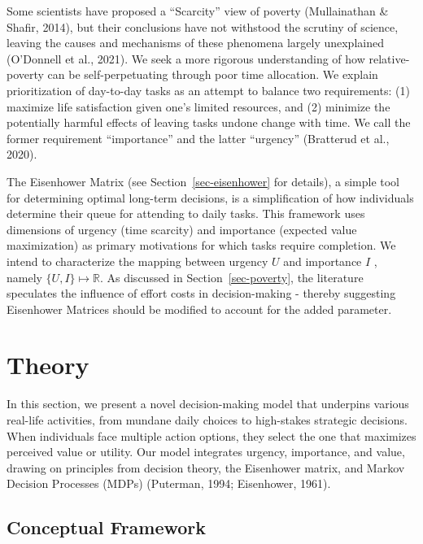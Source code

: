 \documentclass[
]{article}
\begin{document}
Some scientists have proposed a ``Scarcity'' view of poverty
(Mullainathan \& Shafir, 2014), but their conclusions have not withstood
the scrutiny of science, leaving the causes and mechanisms of these
phenomena largely unexplained (O'Donnell et al., 2021). We seek a more
rigorous understanding of how relative-poverty can be self-perpetuating
through poor time allocation. We explain prioritization of day-to-day
tasks as an attempt to balance two requirements: (1) maximize life
satisfaction given one's limited resources, and (2) minimize the
potentially harmful effects of leaving tasks undone change with time. We
call the former requirement ``importance'' and the latter ``urgency''
(Bratterud et al., 2020).

The Eisenhower Matrix (see Section~\ref{sec-eisenhower} for details), a
simple tool for determining optimal long-term decisions, is a
simplification of how individuals determine their queue for attending to
daily tasks. This framework uses dimensions of urgency (time scarcity)
and importance (expected value maximization) as primary motivations for
which tasks require completion. We intend to characterize the mapping
between urgency \(U\) and importance \(I\) , namely
\(\{ U,I \} \mapsto \mathbb{R}\). As discussed in
Section~\ref{sec-poverty}, the literature speculates the influence of
effort costs in decision-making - thereby suggesting Eisenhower Matrices
should be modified to account for the added parameter.

\hypertarget{theory}{%
\section{Theory}\label{theory}}

In this section, we present a novel decision-making model that underpins
various real-life activities, from mundane daily choices to high-stakes
strategic decisions. When individuals face multiple action options, they
select the one that maximizes perceived value or utility. Our model
integrates urgency, importance, and value, drawing on principles from
decision theory, the Eisenhower matrix, and Markov Decision Processes
(MDPs) (Puterman, 1994; Eisenhower, 1961).

\hypertarget{conceptual-framework}{%
\subsection{Conceptual Framework}\label{conceptual-framework}}
\end{document}
